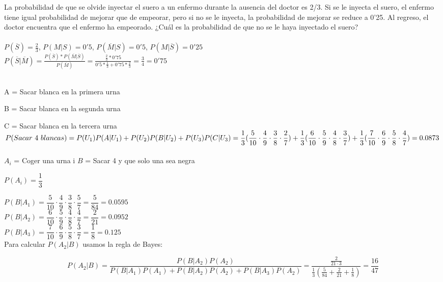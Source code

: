 \problem
La probabilidad de que se olvide inyectar el suero a un enfermo durante la ausencia del doctor es 2/3. Si se le inyecta el suero, el enfermo tiene igual probabilidad de mejorar que de empeorar, pero si no se le inyecta, la probabilidad de mejorar se reduce a 0'25. Al regreso, el doctor encuentra que el enfermo ha empeorado. ¿Cuál es la probabilidad de que no se le haya inyectado el suero? \\ \\
$P(\overline{S}) = \frac{2}{3}$, $P(M|S) = 0'5$, $P(\overline{M}|S) = 0'5$, $P(M|\overline{S}) = 0'25$ \\ 
$P(\overline{S}|\overline{M}) = \frac{P(\overline{S})*P(\overline{M}|\overline{S})}{P(\overline{M})} = \frac{\frac{2}{3}*0'75}{0'5*\frac{1}{3}+0'75*\frac{2}{3}}= \frac{3}{4} = 0'75$


\subproblem \\

A = Sacar blanca en la primera urna

B = Sacar blanca en la segunda urna

C = Sacar blanca en la tercera urna \\


$P(Sacar\ 4 \ blancas) = P(U_1)P(A|U_1) + P(U_2)P(B|U_2) + P(U_3)P(C|U_3) = \\


\dfrac{1}{3}(\dfrac{5}{10}\cdot\dfrac{4}{9}\cdot\dfrac{3}{8}\cdot\dfrac{2}{7}) + 
  \dfrac{1}{3}(\dfrac{6}{10}\cdot\dfrac{5}{9}\cdot\dfrac{4}{8}\cdot\dfrac{3}{7}) + 
  \dfrac{1}{3}(\dfrac{7}{10}\cdot\dfrac{6}{9}\cdot\dfrac{5}{8}\cdot\dfrac{4}{7}) = 0.0873$ \\

\subproblem \\

$A_i$ = Coger una urna i
$B$ = Sacar 4 y que solo una sea negra

$P(A_i) = \dfrac{1}{3}$

$P(B|A_1) = \dfrac{5}{10} \cdot \dfrac{4}{9} \cdot \dfrac{3}{8} \cdot \dfrac{5}{7} = \dfrac{5}{84} = 0.0595$ \\

$P(B|A_2) = \dfrac{6}{10} \cdot \dfrac{5}{9} \cdot \dfrac{4}{8} \cdot \dfrac{4}{7} = \dfrac{2}{21} = 0.0952$ \\

$P(B|A_3) = \dfrac{7}{10} \cdot \dfrac{6}{9} \cdot \dfrac{5}{8} \cdot \dfrac{3}{7} = \dfrac{1}{8} = 0.125$ \\


Para calcular $P(A_2|B)$ usamos la regla de Bayes:

$$ P(A_2|B) = \dfrac{P(B|A_2)P(A_2)}{P(B|A_1)P(A_1)+P(B|A_2)P(A_2)+P(B|A_3)P(A_2)} = \dfrac{\frac{2}{21 \cdot 3}}{\frac{1}{3}(\frac{5}{84} + \frac{2}{21} + \frac{1}{8})} = \dfrac{16}{47}$$
